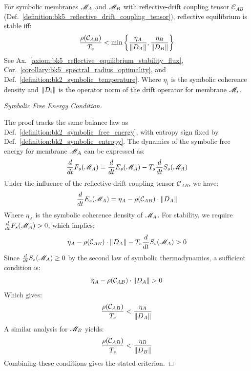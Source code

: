 \begin{theorem} \label{theorem:bk5_reflective_stability_criterion}
For symbolic membranes $\mathscr{M}_A$ and $\mathscr{M}_B$ with reflective-drift coupling tensor $\mathcal{C}_{AB}$ (Def.~\ref{definition:bk5_reflective_drift_coupling_tensor}), reflective equilibrium is stable iff:
\begin{equation}
\frac{\rho(\mathcal{C}_{AB})}{T_s} < \min\left\{\frac{\eta_A}{\|D_A\|}, \frac{\eta_B}{\|D_B\|}\right\}
\end{equation}
See Ax.~\ref{axiom:bk5_reflective_equilibrium_stability_flux}, Cor.~\ref{corollary:bk5_spectral_radius_optimality}, and Def.~\ref{definition:bk2_symbolic_temperature}.
Where $\eta_i$ is the symbolic coherence density and $\|D_i\|$ is the operator norm of the drift operator for membrane $\mathscr{M}_i$.
\end{theorem}
\begin{proof}[Symbolic Free Energy Condition]
\label{proof:bk5_symbolic_free_energy_stability_condition}
\leavevmode

The proof tracks the same balance law as Def.~\ref{definition:bk2_symbolic_free_energy}, with entropy sign fixed by Def.~\ref{definition:bk2_symbolic_entropy}.
The dynamics of the symbolic free energy for membrane $\mathscr{M}_A$ can be expressed as:
\begin{equation}
\frac{d}{dt}F_s(\mathscr{M}_A) = \frac{d}{dt}E_s(\mathscr{M}_A) - T_s\frac{d}{dt}S_s(\mathscr{M}_A)
\end{equation}
Under the influence of the reflective-drift coupling tensor $\mathcal{C}_{AB}$, we have:
\begin{equation}
\frac{d}{dt}E_s(\mathscr{M}_A) = \eta_A - \rho(\mathcal{C}_{AB}) \cdot \|D_A\|
\end{equation}
Where $\eta_A$ is the symbolic coherence density of $\mathscr{M}_A$.
For stability, we require $\frac{d}{dt}F_s(\mathscr{M}_A) > 0$, which implies:
\begin{equation}
\eta_A - \rho(\mathcal{C}_{AB}) \cdot \|D_A\| - T_s\frac{d}{dt}S_s(\mathscr{M}_A) > 0
\end{equation}
Since $\frac{d}{dt}S_s(\mathscr{M}_A) \geq 0$ by the second law of symbolic thermodynamics, a sufficient condition is:
\begin{equation}
\eta_A - \rho(\mathcal{C}_{AB}) \cdot \|D_A\| > 0
\end{equation}
Which gives:
\begin{equation}
\frac{\rho(\mathcal{C}_{AB})}{T_s} < \frac{\eta_A}{\|D_A\|}
\end{equation}
A similar analysis for $\mathscr{M}_B$ yields:
\begin{equation}
\frac{\rho(\mathcal{C}_{AB})}{T_s} < \frac{\eta_B}{\|D_B\|}
\end{equation}
Combining these conditions gives the stated criterion.
\end{proof}

